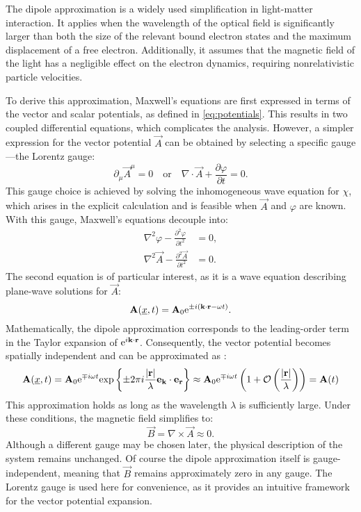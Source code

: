 The dipole approximation is a widely used simplification in light-matter interaction. 
It applies when the wavelength of the optical field is significantly larger than both the size of the relevant bound electron states and the maximum displacement of a free electron. 
Additionally, it assumes that the magnetic field of the light has a negligible effect on the electron dynamics, requiring nonrelativistic particle velocities.

To derive this approximation, Maxwell’s equations are first expressed in terms of the vector and scalar potentials, as defined in \eqref{eq:potentials}.
This results in two coupled differential equations, which complicates the analysis. 
However, a simpler expression for the vector potential $\vec{A}$ can be obtained by selecting a specific gauge—the Lorentz gauge:
\begin{equation*}
    \partial_{\mu} \vec{A}^{\mu} = 0 \quad \text{or} \quad \nabla \cdot \vec{A} + \frac{\partial \varphi}{\partial t} = 0.
\end{equation*}
This gauge choice is achieved by solving the inhomogeneous wave equation for $\chi$, which arises in the explicit calculation and is feasible when $\vec{A}$ and $\varphi$ are known. With this gauge, Maxwell's equations decouple into:
\begin{equation*}
    \begin{aligned}
        \nabla^2 \varphi - \frac{\partial^2 \varphi}{\partial t^2} &= 0, \\
        \nabla^2 \vec{A} - \frac{\partial^2 \vec{A}}{\partial t^2} &= 0.
    \end{aligned}
\end{equation*}
The second equation is of particular interest, as it is a wave equation describing plane-wave solutions for $\vec{A}$:
\begin{equation*}
    \mathbf{A}(\underline{x}, t) = \mathbf{A}_0 \mathrm{e}^{\pm i (\mathbf{k} \cdot \mathbf{r} - \omega t)}.
\end{equation*}
Mathematically, the dipole approximation corresponds to the leading-order term in the Taylor expansion of $\mathrm{e}^{i\mathbf{k} \cdot \mathbf{r}}$. 
Consequently, the vector potential becomes spatially independent and can be approximated as \cite{bosmandipoleapprox}:
\begin{equation*}
    \mathbf{A}(\underline{x}, t) = \mathbf{A}_0\mathrm{e}^{\mp i \omega t}\mathrm{exp}\left\{\pm2\pi i\frac{|\mathbf{r}|}{\lambda}\mathbf{e}_{\mathbf{k}} \cdot \mathbf{e}_{\mathbf{r}}\right\} \approx \mathbf{A}_0 \mathrm{e}^{\mp i \omega t}\left(1+\mathcal{O}\left(\frac{|\mathbf{r}|}{\lambda}\right)\right) = \mathbf{A}(t)
\end{equation*}
This approximation holds as long as the wavelength $\lambda$ is sufficiently large. 
Under these conditions, the magnetic field simplifies to:
\begin{equation*}
    \vec{B} = \nabla \times \vec{A} \approx 0.
\end{equation*}
Although a different gauge may be chosen later, the physical description of the system remains unchanged. 
Of course the dipole approximation itself is gauge-independent, meaning that $\vec{B}$ remains approximately zero in any gauge. 
The Lorentz gauge is used here for convenience, as it provides an intuitive framework for the vector potential expansion.


